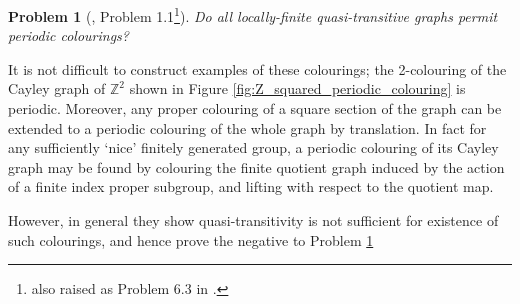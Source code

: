 \documentclass{article}
\numberwithin{equation}{section}
\newcommand{\ZZ}{\mathbb{Z}}
\newtheorem{problem}{Problem}[section]
\theoremstyle{definition}
\theoremstyle{remark}
\begin{document}
\begin{problem}[\cite{abrishami2025periodiccoloringsorientationsinfinite}, Problem 1.1\footnote{also raised as Problem 6.3 in \cite{ESPERETGIOLEG-DUT2024}.}]\label{q:allgraphspermitperiodic?}
    Do all locally-finite quasi-transitive graphs permit periodic colourings?
\end{problem}


It is not difficult to construct examples of these colourings; the 2-colouring of the Cayley graph of $\ZZ^2$ shown in Figure \ref{fig:Z_squared_periodic_colouring} is periodic. Moreover, any proper colouring of a square section of the graph can be extended to a periodic colouring of the whole graph by translation. In fact for any sufficiently `nice' finitely generated group, a periodic colouring of its Cayley graph may be found by colouring the finite quotient graph induced by the action of a finite index proper subgroup, and lifting with respect to the quotient map.


 However, in general they show quasi-transitivity is not sufficient for existence of such colourings, and hence prove the negative to Problem \ref{q:allgraphspermitperiodic?}
 
\end{document}
